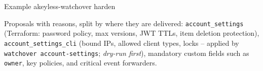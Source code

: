 \begin{session}{Example}
\you akeyless-watchover harden

\agent Proposals with reasons, split by where they are delivered: \texttt{account\_settings}
(Terraform: password policy, max versions, JWT TTLs, item deletion protection),
\texttt{account\_settings\_cli} (bound IPs, allowed client types, locks -- applied by
\texttt{watchover account-settings}; \emph{dry-run first}), mandatory custom fields such as
\texttt{owner}, key policies, and critical event forwarders.
\end{session}
